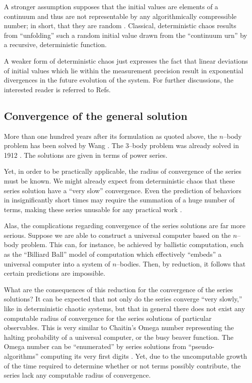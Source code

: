 \documentclass[rmp,amsfonts,showpacs,showkeys]{revtex4}
\begin{document}
A stronger assumption supposes that the initial values are elements of
a continuum and thus are not representable by any algorithmically compressible number;
in short, that they are random \cite{calude:02}.
Classical, deterministic chaos results from ``unfolding'' such a random initial value
drawn from the ``continuum urn'' by a recursive, deterministic function.

A weaker form of deterministic chaos just expresses the fact
that linear deviations of initial values which lie within the measurement precision
result in exponential divergences in the future evolution of the system.
For further discussions, the interested reader is referred to
Refs.~\cite{shaw,crutchFaPaShaw,schuster1,bricmont,Crutchfield90}


\subsection{Convergence of the general solution}

More than one hundred years after its formulation as quoted above,
the $n$--body problem has been solved by Wang \cite{Wang91,Diacu96,Wang01}.
The $3$--body problem was already solved in 1912 \cite{Sundman12}.
The solutions are given in terms of power series.

Yet, in order to be practically applicable,
the radius of convergence of the series must be known.
We might already expect from deterministic chaos
that these series solution have a ``very slow'' convergence.
Even the prediction of behaviors in insignificantly short times
may require the summation of a huge number of terms,
making these series unusable for any practical work
\cite{Diacu96}.

Alas, the complications regarding convergence of the series solutions are far more serious.
Suppose we are able to construct a universal computer based on the $n$--body problem.
This can, for instance, be achieved by ballistic computation, such as the
``Billiard Ball'' model of computation
\cite{fred-tof-82,margolus-02}
which effectively ``embeds'' a universal computer into a system of $n$--bodies.
Then, by reduction, it follows that certain predictions are impossible.

What are the consequences of this reduction for the convergence of the series solutions?
It can be expected that not only do the series converge ``very slowly,''
like in deterministic chaotic systems,
but that in general there does not exist any computable radius of convergence
for the series solutions of particular observables.
This is very similar to Chaitin's Omega number \cite{chaitin3,calude:02}
representing the halting probability of a universal computer, or the busy beaver function.
The Omega number can be ``enumerated''
by series solutions from ``pseudo-algorithms''
computing its very first digits \cite{calude-dinneen06}.
Yet, due to the uncomputable growth of the time
required to determine whether or not terms possibly contribute,
the series lack any computable radius of convergence.
\end{document}
